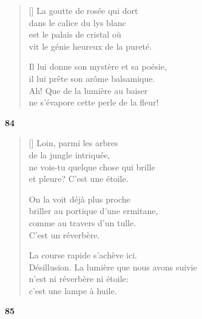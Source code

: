 \documentclass[a4paper,12pt]{book}
\begin{document}
\settowidth{\versewidth}{Il lui donne son mystère et sa poésie,}


\begin{verse}[\versewidth]
  La goutte de rosée qui dort \\
  dans le calice du lys blanc \\
  est le palais de cristal où \\
  vit le génie heureux de la pureté.

  Il lui donne son mystère et sa poésie, \\
  il lui prête son arôme balsamique. \\
  Ah! Que de la lumière au baiser \\
  ne s'évapore cette perle de la fleur!
\end{verse}

\bigskip

\begin{center}
  \textbf{84}
\end{center}

\settowidth{\versewidth}{Désillusion. La lumière que nous avons suivie}

\begin{verse}[\versewidth]
  Loin, parmi les arbres \\
  de la jungle intriquée, \\
  ne vois-tu quelque chose qui brille \\
  et pleure? C'est une étoile.

  On la voit déjà plus proche \\
  briller au portique d'une ermitane, \\
  comme au travers d'un tulle. \\
  C'est un réverbère.

  La course rapide s'achève ici. \\
  Désillusion. La lumière que nous avons suivie \\
  n'est ni réverbère ni étoile: \\
  c'est une lampe à huile.
\end{verse}

\bigskip

\begin{center}
  \textbf{85}
\end{center}
\end{document}
